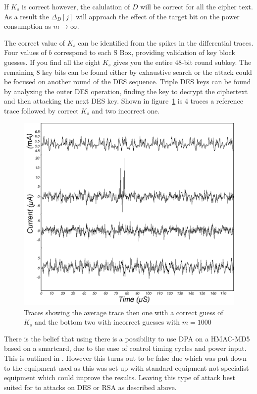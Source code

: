 \documentclass[a4paper,12pt]{article}
\begin{document}
If $K_s$ is correct however, the calulation of $D$ will be correct for all the cipher text. As a result the $\Delta_D[j]$ will approach the effect of the target bit on the power consumption as $m \rightarrow \infty$.

The correct value of $K_s$ can be identified from the spikes in the differential traces. Four values of $b$ correspond to each S Box, providing validation of key block guesses. If you find all the eight $K_s$ gives you the entire 48-bit round subkey. The remaining 8 key bits can be found either by exhaustive search or the attack could be focused on another round of the DES sequence. Triple DES keys can be found by analyzing the outer DES operation, finding the key to decrypt the ciphertext and then attacking the next DES key. Shown in figure~\ref{fig:desResult} is 4 traces a reference trace followed by correct $K_s$ and two incorrect one.

\begin{figure}
    \includegraphics[width=\textwidth]{DPATraces.png}
    \caption{Traces showing the average trace then one with a correct guess of $K_s$ and the bottom two with incorrect guesses with $m = 1000$}
    \label{fig:desResult}
\end{figure}


There is the belief that using there is a possibility to use DPA on a HMAC-MD5 based on a smartcard, due to the ease of control timing cycles and power input. This is outlined in \cite{JiriKur}. However this turns out to be false due which was put down to the equipment used as this was set up with standard equipment not specialist equipment which could improve the results. Leaving this type of attack best suited for to attacks on DES or RSA as described above.
\end{document}
